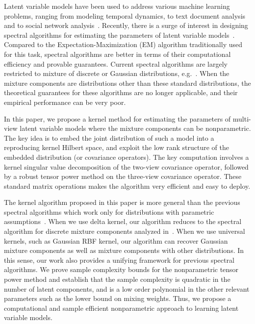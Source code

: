\documentclass{article}
\begin{document}
\setlength{\textfloatsep}{3ex}

Latent variable models have been used to address various machine learning
problems, ranging from modeling temporal dynamics, to text document analysis and to social network analysis~\citep{RabJua86,Clark90,HofRafHan02,BleNgJor03}.
Recently, there is a surge of interest in designing spectral algorithms for estimating the parameters of latent variable models~\citep{HsuKakZha09,ParSonXin11,SonParXin11,FosRodUng12,AnandkumarEtal:tensor12, AnandkumarEtal:twosvd12, Franz13}. Compared to the Expectation-Maximization (EM) algorithm \citep{DemLaiRub77} traditionally used for this task, spectral algorithms are better in terms of their computational efficiency and provable guarantees.
Current spectral algorithms are largely restricted to mixture
of discrete or Gaussian distributions, e.g.~\citep{AnandkumarEtal:tensor12,Hsu13}. When the mixture components are distributions other than these standard distributions, the theoretical guarantees for these algorithms are no longer applicable, and their empirical performance can be very poor.

In this paper, we propose a kernel method for estimating the parameters of multi-view latent variable models where the mixture components can be nonparametric. The key idea  is to embed the joint distribution of such a model into a reproducing kernel Hilbert space, and exploit the low rank structure of the embedded distribution (or covariance operators). The key computation   involves a kernel singular value decomposition of the two-view covariance operator, followed by a robust tensor power method on the three-view covariance operator. These standard matrix operations makes the algorithm very efficient and easy to deploy.

The kernel algorithm proposed in this paper is more general than the previous spectral algorithms which work only for distributions with parametric assumptions~\citep{AnandkumarEtal:tensor12,Hsu13}. When we use delta kernel, our algorithm reduces to the spectral algorithm for discrete mixture components analyzed in~\citep{AnandkumarEtal:tensor12}. When we use universal kernels, such as Gaussian RBF kernel, our algorithm can recover Gaussian mixture components as well as mixture components with other distributions. In this sense, our work also provides a unifying framework for previous spectral algorithms. We prove sample complexity bounds for the nonparametric tensor power method and establish  that the sample complexity is quadratic in the number of latent components, and is a low order polynomial in the other relevant parameters such as the lower bound on mixing weights. Thus, we propose a computational and sample efficient nonparametric approach to learning latent variable models.
\end{document}
